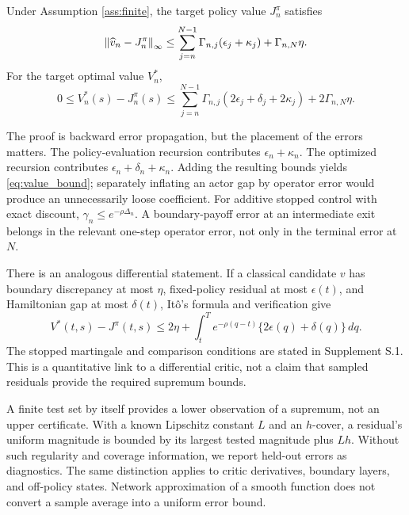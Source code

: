 \begin{theorem}
\label{thm:error}
Under Assumption \ref{ass:finite}, the target policy value $J_n^\pi$ satisfies
\begin{equation}
 \left\lVert\widehat v_n-J_n^\pi\right\rVert_\infty
 \leq\sum_{j=n}^{N-1}\Gamma_{n,j}(\epsilon_j+\kappa_j)
             +\Gamma_{n,N}\eta.
 \label{eq:evaluation_bound}
\end{equation}
For the target optimal value $V_n^*$,
\begin{equation}
 0\leq V_n^*(s)-J_n^\pi(s)
 \leq\sum_{j=n}^{N-1}\Gamma_{n,j}
       (2\epsilon_j+\delta_j+2\kappa_j)
       +2\Gamma_{n,N}\eta.
 \label{eq:value_bound}
\end{equation}
\end{theorem}

The proof is backward error propagation, but the placement of the errors matters. The policy-evaluation recursion contributes $\epsilon_n+\kappa_n$. The optimized recursion contributes $\epsilon_n+\delta_n+\kappa_n$. Adding the resulting bounds yields \eqref{eq:value_bound}; separately inflating an actor gap by operator error would produce an unnecessarily loose coefficient. For additive stopped control with exact discount, $\gamma_n\leq e^{-\rho\Delta_n}$. A boundary-payoff error at an intermediate exit belongs in the relevant one-step operator error, not only in the terminal error at $N$.

There is an analogous differential statement. If a classical candidate $v$ has boundary discrepancy at most $\eta$, fixed-policy residual at most $\epsilon(t)$, and Hamiltonian gap at most $\delta(t)$, It\^o's formula and verification give
\begin{equation}
 V^*(t,s)-J^\pi(t,s)
 \leq 2\eta+\int_t^T e^{-\rho(q-t)}\{2\epsilon(q)+\delta(q)\}\,dq.
 \label{eq:differential_bound}
\end{equation}
The stopped martingale and comparison conditions are stated in Supplement S.1. This is a quantitative link to a differential critic, not a claim that sampled residuals provide the required supremum bounds.

A finite test set by itself provides a lower observation of a supremum, not an upper certificate. With a known Lipschitz constant $L$ and an $h$-cover, a residual's uniform magnitude is bounded by its largest tested magnitude plus $Lh$. Without such regularity and coverage information, we report held-out errors as diagnostics. The same distinction applies to critic derivatives, boundary layers, and off-policy states. Network approximation of a smooth function does not convert a sample average into a uniform error bound.

